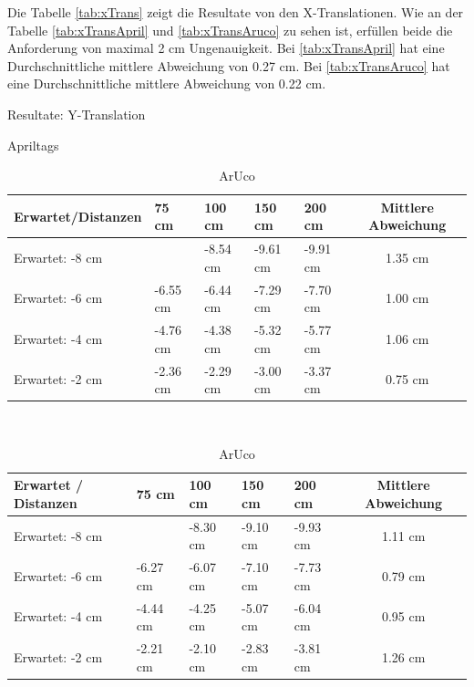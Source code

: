 Die Tabelle \ref{tab:xTrans} zeigt die Resultate von den X-Translationen. 
Wie an der Tabelle \ref{tab:xTransApril} und \ref{tab:xTransAruco} zu sehen ist, erfüllen beide die Anforderung von maximal 2 cm Ungenauigkeit.
Bei \ref{tab:xTransApril} hat eine Durchschnittliche mittlere Abweichung von 0.27 cm. 
Bei \ref{tab:xTransAruco} hat eine Durchschnittliche mittlere Abweichung von 0.22 cm. 

\begin{table}[!htb]
    \caption{Resultate: Y-Translation}
    \label{tab:yTrans}
    \begin{subtable}{\linewidth}
        \centering
        \caption{Apriltags}
        \label{tab:yTransApriltag}
        \begin{tabular}{|l|l|l|l|l|c|}
            \hline
            Erwartet/Distanzen & 75 cm & 100 cm & 150 cm & 200 cm & Mittlere Abweichung\\
            \hline
            Erwartet:   -8 cm &          & -8.54 cm & -9.61 cm & -9.91 cm & 1.35 cm\\
            \hline
            Erwartet:   -6 cm & -6.55 cm & -6.44 cm  & -7.29 cm & -7.70 cm & 1.00 cm\\
            \hline
            Erwartet:   -4 cm & -4.76 cm & -4.38 cm & -5.32 cm & -5.77 cm & 1.06 cm\\
            \hline
            Erwartet:   -2 cm & -2.36 cm  & -2.29 cm & -3.00 cm & -3.37 cm & 0.75 cm\\
            \hline
        \end{tabular}
    \end{subtable}
    \\[\smallskipamount]
    \begin{subtable}{\linewidth}
        \centering
        \caption{ArUco}
        \label{tab:yTransAruco}
            \begin{tabular}{|l|l|l|l|l|c|}
            \hline
            Erwartet / Distanzen & 75 cm & 100 cm & 150 cm & 200 cm & Mittlere Abweichung \\
            \hline
            Erwartet:   -8 cm &          & -8.30 cm & -9.10 cm & -9.93 cm & 1.11 cm \\
            \hline
            Erwartet:   -6 cm & -6.27 cm  & -6.07 cm & -7.10 cm & -7.73 cm & 0.79 cm\\
            \hline
            Erwartet:   -4 cm & -4.44 cm & -4.25 cm & -5.07 cm & -6.04 cm & 0.95 cm \\
            \hline
            Erwartet:   -2 cm & -2.21 cm & -2.10 cm  & -2.83 cm & -3.81 cm & 1.26 cm\\
            \hline
        \end{tabular}
    \end{subtable} 
\end{table}

